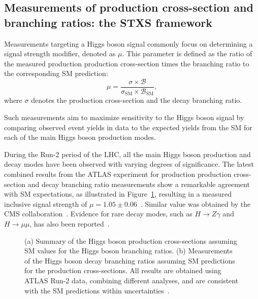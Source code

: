 \subsection{Measurements of production cross-section and branching ratios: the STXS framework}
\label{sec:stxs_yukawa}


Measurements targeting a Higgs boson signal commonly focus on determining a signal strength modifier, denoted as $\mu$. This parameter is defined as the ratio of the measured production production cross-section times the branching ratio to the corresponding SM prediction:
\begin{equation}
\label{signal_strength}
    \mu = \frac{\sigma \times \mathcal{B}}{\sigma_{\mathrm{SM}} \times \mathcal{B}_{\mathrm{SM}}},
\end{equation}
where $\sigma$ denotes the production cross-section and  the decay branching ratio.

Such measurements aim to maximize sensitivity to the Higgs boson signal by comparing observed event yields in data to the expected yields from the SM for each of the main Higgs boson production modes.

During the Run-2 period of the LHC, all the main Higgs boson production and decay modes have been observed with varying degrees of significance. The latest combined results from the ATLAS experiment for production production cross-section and decay branching ratio measurements show a remarkable agreement with SM expectations, as illustrated in Figure~\ref{fig:higgs_mu}, resulting in a measured inclusive signal strength of $\mu = 1.05 \pm 0.06$~\cite{Nature_ATLAS}. Similar value was obtained by the CMS collaboration~\cite{CMS:2022dwd}. Evidence for rare decay modes, such as $H \to Z\gamma$ and $H \to \mu\mu$, has also been reported~\cite{Aad_2024,muon2021}.

\begin{figure}[htbp]
    \centering
    \hfill
    \caption{(a) Summary of the Higgs boson production cross-sections assuming SM values for the Higgs boson branching ratios. 
    (b) Measurements of the Higgs boson decay branching ratios assuming SM predictions for the production cross-sections. 
    All results are obtained using ATLAS Run-2 data, combining different analyses, and are consistent with the SM predictions within uncertainties~\cite{Nature_ATLAS}.}
    \label{fig:higgs_mu}
\end{figure}


